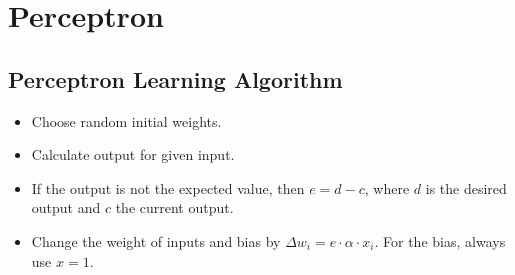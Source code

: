 \documentclass[main]{subfiles}
\begin{document}

\section{Perceptron}

\subsection{Perceptron Learning Algorithm}

\begin{itemize}[noitemsep,nolistsep]
	\item Choose random initial weights.
	\item Calculate output for given input.
	\item If the output is not the expected value, then $e=d-c$, where $d$ is the desired output and $c$ the current output.
	\item Change the weight of inputs and bias by $\Delta w_i=e\cdot\alpha\cdot x_i$. For the bias, always use $x=1$.
\end{itemize}
\end{document}
